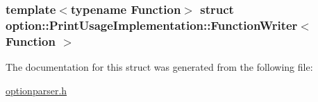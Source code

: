 \subsubsection*{template$<$typename Function$>$ struct option\-::\-Print\-Usage\-Implementation\-::\-Function\-Writer$<$ Function $>$}



\-The documentation for this struct was generated from the following file\-:\begin{DoxyCompactItemize}
\item 
\hyperlink{optionparser_8h}{optionparser.\-h}\end{DoxyCompactItemize}
